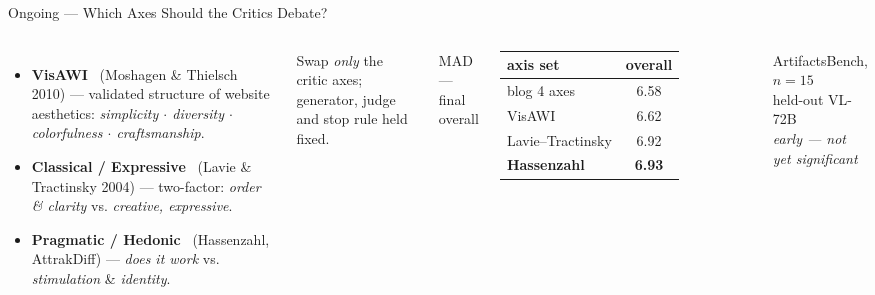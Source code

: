 \documentclass[aspectratio=169,10pt]{beamer}
\begin{document}
\begin{frame}{Ongoing --- Which Axes Should the Critics Debate?}
    \vspace{0.3cm}
    \begin{columns}[T]
    \small
    \begin{itemize}
        \setlength{\itemsep}{0.32cm}
        \item \textbf{VisAWI} \ {\footnotesize (Moshagen \& Thielsch 2010)} ---
              validated structure of website aesthetics: \emph{simplicity
              $\cdot$ diversity $\cdot$ colorfulness $\cdot$ craftsmanship}.
        \item \textbf{Classical / Expressive} \ {\footnotesize (Lavie \&
              Tractinsky 2004)} --- two-factor: \emph{order \& clarity} vs.
              \emph{creative, expressive}.
        \item \textbf{Pragmatic / Hedonic} \ {\footnotesize (Hassenzahl,
              AttrakDiff)} --- \emph{does it work} vs. \emph{stimulation}
              \& \emph{identity}.
    \end{itemize}

    \vspace{0.25cm}
    {\footnotesize Swap \emph{only} the critic axes; generator, judge and
    stop rule held fixed.}

    \vspace{0.5cm}
    \centering
    {\footnotesize MAD --- final overall}

    \vspace{0.15cm}
    \small
    \begin{tabular}{@{}lc@{}}
        \toprule
        \textbf{axis set} & \textbf{overall} \\
        \midrule
        blog 4 axes         & 6.58 \\
        VisAWI              & 6.62 \\
        Lavie--Tractinsky   & 6.92 \\
        \textbf{Hassenzahl} & \color{winner}\textbf{6.93} \\
        \bottomrule
    \end{tabular}

    \vspace{0.25cm}
    {\scriptsize ArtifactsBench, $n{=}15$ \\ held-out VL-72B \\ \emph{early --- not yet significant}}
    \end{columns}
\end{frame}
\end{document}
